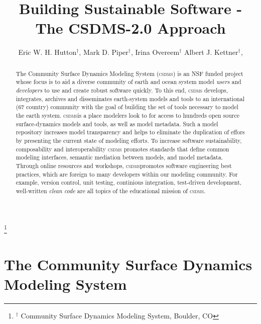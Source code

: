 \documentclass[11pt, oneside]{amsart}
\DeclareRobustCommand{\csdms}{\textsc{csdms}}
\begin{document}
\title[]{Building Sustainable Software - The CSDMS-2.0 Approach}

\author{
  Eric W. H. Hutton$^{\dag}$,
  Mark D. Piper$^{\dag}$,
  Irina Overeem$^{\dag}$
  Albert J. Kettner$^{\dag}$,
}

\thanks{{}$^{\dag}$ Community Surface Dynamics Modeling System, Boulder, CO}

\begin{abstract}

The Community Surface Dynamics Modeling System (\csdms{}) is an NSF funded
project whose focus is to aid a diverse community of earth and ocean system
model \emph{users} and \emph{developers} to use and create robust software
quickly.  To this end, \csdms{} develops, integrates, archives and disseminates
earth-system models and tools to an international (67 country) community
with the goal of building the set of tools necessary to model the
earth system. \csdms is a place modelers look to for access to hundreds open
source surface-dynamics models and tools, as well as model metadata. Such a
model repository increases model transparency and helps to eliminate the
duplication of effors by presenting the current state of modeling efforts.
To increase software sustainability, composability and interoperability \csdms
promotes standards that define common modeling interfaces, semantic mediation
between models, and model metadata. Through online resources and workshops,
\csdms promotes software engineering best practices, which are foreign to many
developers within our modeling community. For example, version control, unit
testing, continious integration, test-driven development, well-written
\emph{clean code} are all topics of the educational mission of \csdms{}.

\end{abstract}

\maketitle

\section{The Community Surface Dynamics Modeling System}
\end{document}
